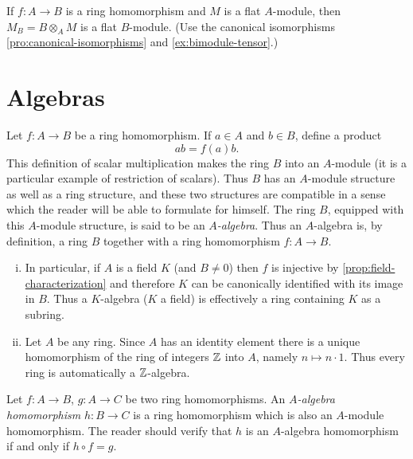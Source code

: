 \begin{exercise}\label{ex:flat-base-change}
If $f \colon A \to B$ is a ring homomorphism and $M$ is a flat $A$-module, then $M_B = B \otimes_A M$ is a flat $B$-module. (Use the canonical isomorphisms \eqref{pro:canonical-isomorphisms} and \eqref{ex:bimodule-tensor}.)
\end{exercise}

\section*{Algebras}

Let $f \colon A \to B$ be a ring homomorphism. If $a \in A$ and $b \in B$, define a product
\[
    ab = f(a)b.
\]
This definition of scalar multiplication makes the ring $B$ into an $A$-module (it is a particular example of restriction of scalars). Thus $B$ has an $A$-module structure as well as a ring structure, and these two structures are compatible in a sense which the reader will be able to formulate for himself. The ring $B$, equipped with this $A$-module structure, is said to be an \emph{$A$-algebra}. Thus an $A$-algebra is, by definition, a ring $B$ together with a ring homomorphism $f \colon A \to B$.

\begin{remark}
\begin{enumerate}[i)]
    \item In particular, if $A$ is a field $K$ (and $B \neq 0$) then $f$ is injective by \eqref{prop:field-characterization} and therefore $K$ can be canonically identified with its image in $B$. Thus a $K$-algebra ($K$ a field) is effectively a ring containing $K$ as a subring.
    
    \item Let $A$ be any ring. Since $A$ has an identity element there is a unique homomorphism of the ring of integers $\mathbb{Z}$ into $A$, namely $n \mapsto n \cdot 1$. Thus every ring is automatically a $\mathbb{Z}$-algebra.
\end{enumerate}
\end{remark}

Let $f \colon A \to B$, $g \colon A \to C$ be two ring homomorphisms. An \emph{$A$-algebra homomorphism} $h \colon B \to C$ is a ring homomorphism which is also an $A$-module homomorphism. The reader should verify that $h$ is an $A$-algebra homomorphism if and only if $h \circ f = g$.


